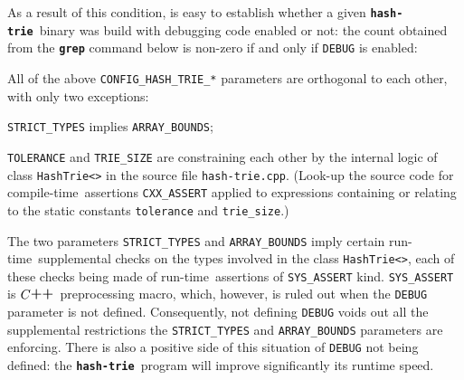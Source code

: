 \documentclass[a4paper,11pt]{article}
\renewcommand{\=}{\protect\nobreakdash-\hspace{0pt}}
\renewcommand{\~}{\protect\nobreakdash--\hspace{0pt}}
\newcommand{\plusplus}{\textbf{\raisebox{1pt}{++}}}
\newcommand{\cplusplus}{$C\plusplus$}
\newcommand{\hashtrie}{{\tt\textbf{hash-trie}}}
\newcommand\hashtrie*{\emph{hash\=trie}}
\newcommand{\code}[1]{{\tt{#1}}}
\newcommand\code*[1]{\mbox{\code{#1}}}
\newcommand{\prog}[1]{{\tt\textbf{#1}}}
\newcommand{\compiletime}{compile\=time}
\newcommand{\runtime}{run\=time}
\begin{document}
As a result of this condition, is easy to establish whether a given
\hashtrie\ binary was build with debugging code enabled or not: the count obtained
from the \prog{grep} command below is non-zero if and only if \code{DEBUG}
is enabled:
%
%
All of the above \code{CONFIG\_HASH\_TRIE\_*} parameters are orthogonal
to each other, with only two exceptions:
%
\begin{bitemize}
\item \code{STRICT\_TYPES} implies \code{ARRAY\_BOUNDS};
\item \code{TOLERANCE} and \code{TRIE\_SIZE}
are constraining each other by the internal logic of class \code{HashTrie<>}
in the source file \code{hash-trie.cpp}. (Look-up the source code for
\compiletime\ assertions \code{CXX\_ASSERT} applied to expressions containing
or relating to the static constants \code{tolerance} and \code{trie\_size}.)
\end{bitemize}
%
The two parameters \code{STRICT\_TYPES} and \code{ARRAY\_BOUNDS} imply certain
\runtime\ supplemental checks on the types involved in the class \code{HashTrie<>},
each of these checks being made of \runtime\ assertions of \code{SYS\_ASSERT} kind.
\code{SYS\_ASSERT} is \cplusplus\ preprocessing macro, which, however,
is ruled out when the \code{DEBUG} parameter is not defined. Consequently,
not defining \code{DEBUG} voids out all the supplemental restrictions
the \code{STRICT\_TYPES} and \code{ARRAY\_BOUNDS} parameters are enforcing.
There is also a positive side of this situation of \code{DEBUG} not being defined:
the \hashtrie\ program will improve significantly its runtime speed.
\end{document}
